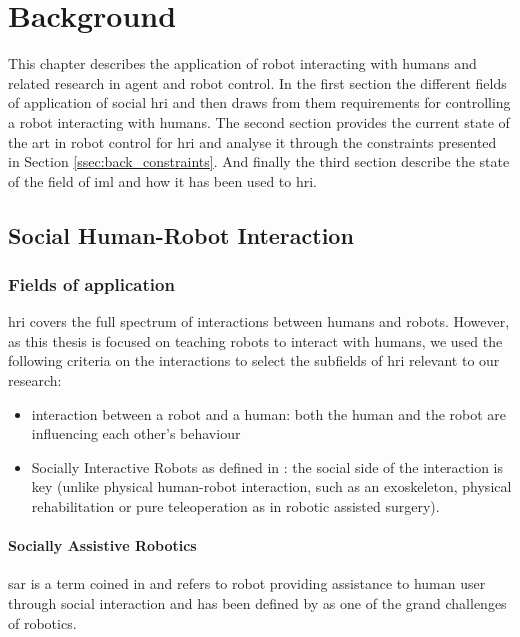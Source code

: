 \chapter{Background} \label{chap:background}

This chapter describes the application of robot interacting with humans and related research in agent and robot control. In the first section the different fields of application of social \gls{hri} and then draws from them requirements for controlling a robot interacting with humans.  The second section provides the current state of the art in robot control for \gls{hri} and analyse it through the constraints presented in Section \ref{ssec:back_constraints}. And finally the third section describe the state of the field of \acrlong{iml} and how it has been used to \gls{hri}.

\section{Social Human-Robot Interaction}

\subsection{Fields of application}

\acrlong{hri} covers the full spectrum of interactions between humans and robots. However, as this thesis is focused on teaching robots to interact with humans, we used the following criteria on the interactions to select the subfields of \gls{hri} relevant to our research:
\begin{itemize}
\item interaction between a robot and a human: both the human and the robot are influencing each other's behaviour
\item Socially Interactive Robots as defined in \citep{Fong2003}: the social
    side of the interaction is key (unlike physical human-robot interaction, such as an exoskeleton, physical rehabilitation or pure teleoperation as in robotic assisted surgery).
\end{itemize}

\subsubsection{Socially Assistive Robotics}

	\gls{sar} is a term coined in \cite{feil2005defining} and refers to robot providing assistance to human user through social interaction and has been defined by \cite{tapus2007socially} as one of the grand challenges of robotics.
	

